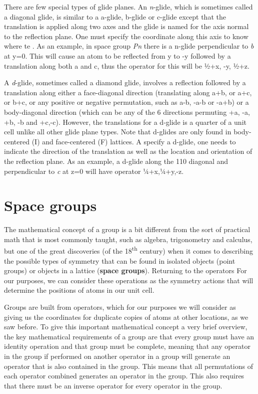 There are few special types of glide planes. An \textit{n}-glide, which is sometimes called a diagonal glide, is similar to a a-glide, b-glide or c-glide except that the translation is applied along two axes and the glide is named for the axis normal to the reflection plane. One must specify the coordinate along this axis to know where te . As an example, in space group \textit{Pn} there is a n-glide perpendicular to \textit{b} at y=0. This will cause an atom to be reflected from y to -y followed by a translation along both a and c, thus the operator for this will be ½+x, -y, ½+z. 

 A \textit{d}-glide, sometimes called a diamond glide, involves a reflection followed by a translation along either a face-diagonal direction (translating along a+b, or a+c, or b+c, or any positive or negative permutation, such as a-b, -a-b or -a+b) or a body-diagonal direction (which can be any of the 6 directions permuting +a, -a, +b, -b and +c,-c). However, the translations for a d-glide is a quarter of a unit cell unlike all other glide plane types. Note that d-glides are only found in body-centered (I) and face-centered (F) lattices. A specify a d-glide, one needs to indicate the direction of the translation as well as the location and orientation of the reflection plane. As an example, a d-glide along the 110 diagonal and perpendicular to \textit{c} at z=0 will have operator ¼+x,¼+y,-z. 

\section{Space groups}

The mathematical concept of a group is a bit different from the sort of practical math that is most commonly taught, such as algebra, trigonometry and calculus, but one of the great discoveries (of the 18\textsuperscript{th} century) when it comes to describing the possible types of symmetry that can be found in isolated objects (point groups) or objects in a lattice (\textbf{space groups}). Returning to the operators For our purposes, we can consider these operations as the symmetry actions that will determine the positions of atoms in our unit cell. 

Groups are built from operators, which for our purposes we will consider as giving us the coordinates for duplicate copies of atoms at other locations, as we saw before. To give this important mathematical concept a very brief overview, the key mathematical requirements of a group are that every group must have an identity operation and that group must be complete, meaning that any operator in the group if performed on another operator in a group will generate an operator that is also contained in the group. This means that all permutations of each operator combined generates an operator in the group. This also requires that there must be an inverse operator for every operator in the group.

